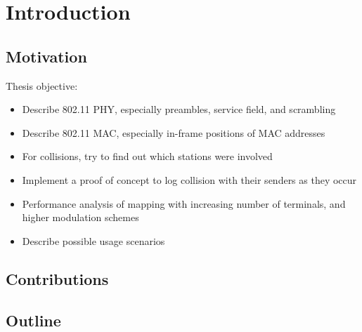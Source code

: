 \chapter{Introduction}\label{ch:introduction}
\glsresetall %



\section{Motivation}

Thesis objective:

\begin{itemize}
	\item Describe 802.11 PHY, especially preambles, service field, and scrambling
	\item Describe 802.11 MAC, especially in-frame positions of MAC addresses
	\item For collisions, try to find out which stations were involved
	\item Implement a proof of concept to log collision with their senders as they occur
	\item Performance analysis of mapping with increasing number of terminals, and higher modulation schemes
	\item Describe possible usage scenarios
\end{itemize}



\section{Contributions}



\section{Outline}
